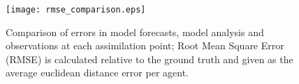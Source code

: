 \begin{figure}[h]
    \centering
    \texttt{[image: rmse\_comparison.eps]}
    \caption[Comparison of errors in model forecasts, model analysis and
    observations at each assimilation point.]{Comparison of errors in model
    forecasts, model analysis and observations at each assimilation point; Root
    Mean Square Error (RMSE) is calculated relative to the ground
    truth and given as the average euclidean distance error per
    agent.}\label{fig:rmse_comparison}
\end{figure}

